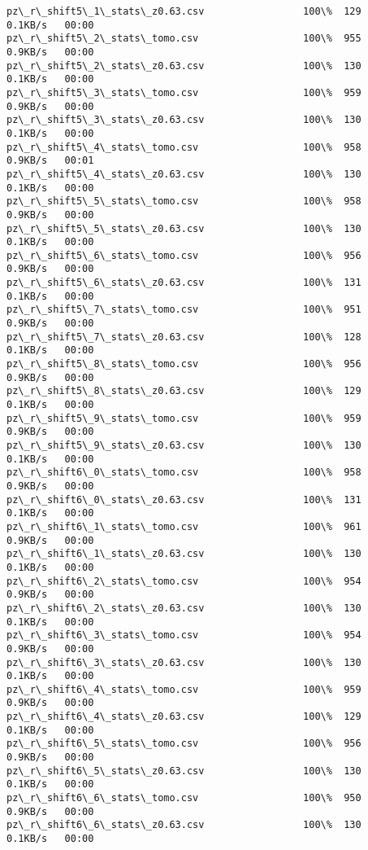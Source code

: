 \documentclass[11pt]{article}
\begin{document}
\begin{Verbatim}[commandchars=\\\{\}]
pz\_r\_shift5\_1\_stats\_z0.63.csv                 100\%  129     0.1KB/s   00:00    
pz\_r\_shift5\_2\_stats\_tomo.csv                  100\%  955     0.9KB/s   00:00    
pz\_r\_shift5\_2\_stats\_z0.63.csv                 100\%  130     0.1KB/s   00:00    
pz\_r\_shift5\_3\_stats\_tomo.csv                  100\%  959     0.9KB/s   00:00    
pz\_r\_shift5\_3\_stats\_z0.63.csv                 100\%  130     0.1KB/s   00:00    
pz\_r\_shift5\_4\_stats\_tomo.csv                  100\%  958     0.9KB/s   00:01    
pz\_r\_shift5\_4\_stats\_z0.63.csv                 100\%  130     0.1KB/s   00:00    
pz\_r\_shift5\_5\_stats\_tomo.csv                  100\%  958     0.9KB/s   00:00    
pz\_r\_shift5\_5\_stats\_z0.63.csv                 100\%  130     0.1KB/s   00:00    
pz\_r\_shift5\_6\_stats\_tomo.csv                  100\%  956     0.9KB/s   00:00    
pz\_r\_shift5\_6\_stats\_z0.63.csv                 100\%  131     0.1KB/s   00:00    
pz\_r\_shift5\_7\_stats\_tomo.csv                  100\%  951     0.9KB/s   00:00    
pz\_r\_shift5\_7\_stats\_z0.63.csv                 100\%  128     0.1KB/s   00:00    
pz\_r\_shift5\_8\_stats\_tomo.csv                  100\%  956     0.9KB/s   00:00    
pz\_r\_shift5\_8\_stats\_z0.63.csv                 100\%  129     0.1KB/s   00:00    
pz\_r\_shift5\_9\_stats\_tomo.csv                  100\%  959     0.9KB/s   00:00    
pz\_r\_shift5\_9\_stats\_z0.63.csv                 100\%  130     0.1KB/s   00:00    
pz\_r\_shift6\_0\_stats\_tomo.csv                  100\%  958     0.9KB/s   00:00    
pz\_r\_shift6\_0\_stats\_z0.63.csv                 100\%  131     0.1KB/s   00:00    
pz\_r\_shift6\_1\_stats\_tomo.csv                  100\%  961     0.9KB/s   00:00    
pz\_r\_shift6\_1\_stats\_z0.63.csv                 100\%  130     0.1KB/s   00:00    
pz\_r\_shift6\_2\_stats\_tomo.csv                  100\%  954     0.9KB/s   00:00    
pz\_r\_shift6\_2\_stats\_z0.63.csv                 100\%  130     0.1KB/s   00:00    
pz\_r\_shift6\_3\_stats\_tomo.csv                  100\%  954     0.9KB/s   00:00    
pz\_r\_shift6\_3\_stats\_z0.63.csv                 100\%  130     0.1KB/s   00:00    
pz\_r\_shift6\_4\_stats\_tomo.csv                  100\%  959     0.9KB/s   00:00    
pz\_r\_shift6\_4\_stats\_z0.63.csv                 100\%  129     0.1KB/s   00:00    
pz\_r\_shift6\_5\_stats\_tomo.csv                  100\%  956     0.9KB/s   00:00    
pz\_r\_shift6\_5\_stats\_z0.63.csv                 100\%  130     0.1KB/s   00:00    
pz\_r\_shift6\_6\_stats\_tomo.csv                  100\%  950     0.9KB/s   00:00    
pz\_r\_shift6\_6\_stats\_z0.63.csv                 100\%  130     0.1KB/s   00:00    

\end{Verbatim}
\end{document}
